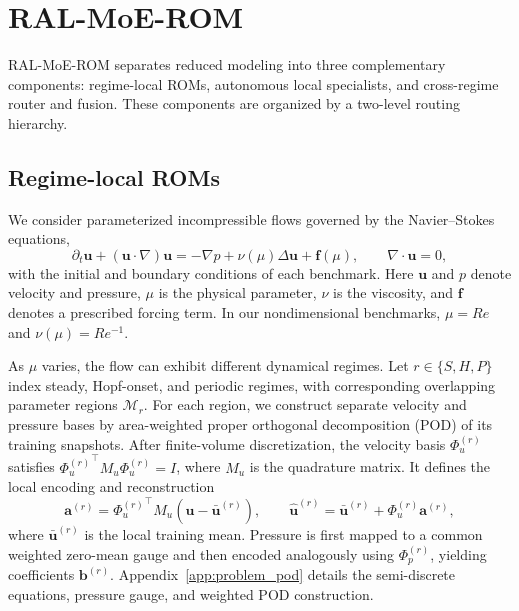 \section{RAL-MoE-ROM}
\label{sec:method}

RAL-MoE-ROM separates reduced modeling into three complementary components: regime-local ROMs, autonomous local specialists, and cross-regime router and fusion. These components are organized by a two-level routing hierarchy. 

\subsection{Regime-local ROMs}
\label{sec:local_roms}

We consider parameterized incompressible flows governed by the
Navier--Stokes equations,
\begin{equation}
  \partial_t\bm u+(\bm u\cdot\nabla)\bm u
  =-\nabla p+\nu(\mu)\Delta\bm u+\bm f(\mu),
  \qquad \nabla\cdot\bm u=0,
  \label{eq:main_ns}
\end{equation}
with the initial and boundary conditions of each benchmark. Here
$\bm u$ and $p$ denote velocity and pressure, $\mu$ is the physical
parameter, $\nu$ is the viscosity, and $\bm f$ denotes a prescribed
forcing term. In our nondimensional benchmarks, $\mu=Re$ and
$\nu(\mu)=Re^{-1}$.

As $\mu$ varies, the flow can exhibit different dynamical regimes.
Let $r\in\{S,H,P\}$ index steady, Hopf-onset, and periodic regimes,
with corresponding overlapping parameter regions $\mathcal M_r$.
For each region, we construct separate velocity and pressure bases by
area-weighted proper orthogonal decomposition (POD) of its training
snapshots. After finite-volume discretization, the velocity basis
$\Phi_u^{(r)}$ satisfies ${\Phi_u^{(r)}}^\top M_u\Phi_u^{(r)}=I$,
where $M_u$ is the quadrature matrix. It defines the local encoding
and reconstruction
\begin{equation}
  \bm a^{(r)}={\Phi_u^{(r)}}^{\top}M_u(\bm u-\bar{\bm u}^{(r)}),\qquad
  \widehat{\bm u}^{(r)}=\bar{\bm u}^{(r)}+\Phi_u^{(r)}\bm a^{(r)},
  \label{eq:main_chart}
\end{equation}
where $\bar{\bm u}^{(r)}$ is the local training mean. Pressure is first
mapped to a common weighted zero-mean gauge and then encoded analogously
using $\Phi_p^{(r)}$, yielding coefficients $\bm b^{(r)}$.
Appendix~\ref{app:problem_pod} details the semi-discrete equations,
pressure gauge, and weighted POD construction.

